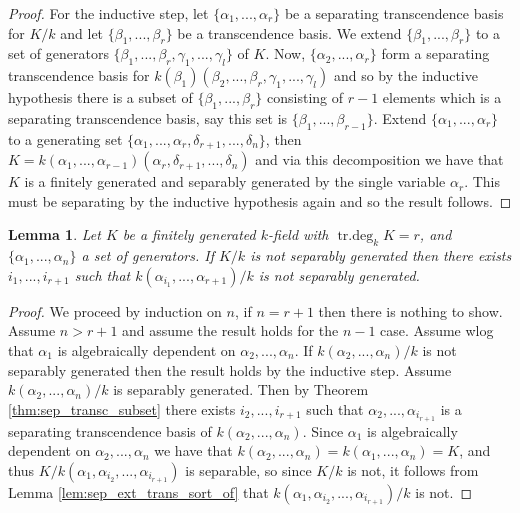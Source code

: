 \documentclass[12pt]{article}
\theoremstyle{plain}
\newtheorem{lemma}[thm]{Lemma}
\theoremstyle{definition}
\begin{document}
\begin{proof}
For the inductive step, let $\lbrace \alpha_1,...,\alpha_r\rbrace$ be a separating transcendence basis for $K/k$ and let $\lbrace \beta_1,...,\beta_r\rbrace$ be a transcendence basis. We extend $\lbrace \beta_1,...,\beta_r\rbrace$ to a set of generators $\lbrace \beta_1,...,\beta_r,\gamma_1,...,\gamma_l\rbrace$ of $K$. Now, $\lbrace \alpha_2,...,\alpha_r\rbrace$ form a separating transcendence basis for $k(\beta_1)(\beta_2,...,\beta_r,\gamma_1,...,\gamma_l)$ and so by the inductive hypothesis there is a subset of $\lbrace \beta_1,...,\beta_r\rbrace$ consisting of $r-1$ elements which is a separating transcendence basis, say this set is $\lbrace \beta_1,...,\beta_{r-1}\rbrace$. Extend $\lbrace \alpha_1,...,\alpha_r\rbrace$ to a generating set $\lbrace \alpha_1,...,\alpha_r,\delta_{r+1},...,\delta_n\rbrace$, then $K = k(\alpha_1,...,\alpha_{r-1})(\alpha_r,\delta_{r+1},...,\delta_{n})$ and via this decomposition we have that $K$ is a finitely generated and separably generated by the single variable $\alpha_r$. This must be separating by the inductive hypothesis again and so the result follows.
\end{proof}
\begin{lemma}
\label{lem:not_sep_ext} Let $K$ be a finitely generated $k$-field with $\operatorname{tr.deg}_kK = r$, and $\lbrace \alpha_1,...,\alpha_n\rbrace$ a set of generators. If $K/k$ is not separably generated then there exists $i_1,...,i_{r+1}$ such that $k(\alpha_{i_1},...,\alpha_{r+1})/k$ is not separably generated.
\end{lemma}
\begin{proof}
We proceed by induction on $n$, if $n = r+1$ then there is nothing to show. Assume $n > r+1$ and assume the result holds for the $n-1$ case. Assume wlog that $\alpha_1$ is algebraically dependent on $\alpha_2,...,\alpha_n$. If $k(\alpha_2,...,\alpha_n)/k$ is not separably generated then the result holds by the inductive step. Assume $k(\alpha_2,...,\alpha_n)/k$ is separably generated. Then by Theorem \ref{thm:sep_transc_subset} there exists $i_2,...,i_{r+1}$ such that $\alpha_2,...,\alpha_{i_{r+1}}$ is a separating transcendence basis of $k(\alpha_2,...,\alpha_n)$. Since $\alpha_1$ is algebraically dependent on $\alpha_2,...,\alpha_n$ we have that $k(\alpha_2,...,\alpha_n) = k(\alpha_1,...,\alpha_n) = K$, and thus $K/k(\alpha_1,\alpha_{i_2},...,\alpha_{i_{r+1}})$ is separable, so since $K/k$ is not, it follows from Lemma \ref{lem:sep_ext_trans_sort_of} that $k(\alpha_1,\alpha_{i_2},...,\alpha_{i_{r+1}})/k$ is not.
\end{proof}
\end{document}
